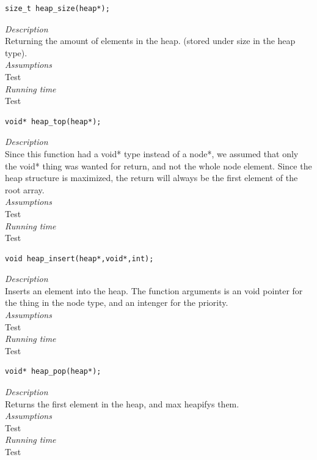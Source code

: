 \documentclass[11pt]{article}
\begin{document}
 \begin{lstlisting}[style=customc] 
size_t heap_size(heap*);\end{lstlisting} 

\textit{Description}\\
Returning the amount of elements in the heap. (stored under size in the heap type).\\
\textit{Assumptions}\\
Test\\
\textit{Running time}\\
Test





 \begin{lstlisting}[style=customc] 
void* heap_top(heap*);\end{lstlisting}

\textit{Description}\\
Since this function had a void* type instead of a node*, we assumed that only the void* thing was wanted for return, and not the whole node element. Since the heap structure is maximized, the return will always be the first element of the root array.\\
\textit{Assumptions}\\
Test\\
\textit{Running time}\\
Test

 


 \begin{lstlisting}[style=customc] 
void heap_insert(heap*,void*,int); \end{lstlisting} 

\textit{Description}\\
Inserts an element into the heap. The function arguments is an void pointer for the thing in the node type, and an intenger for the priority.\\ 
\textit{Assumptions}\\
Test\\
\textit{Running time}\\
Test


 \begin{lstlisting}[style=customc] 
void* heap_pop(heap*);\end{lstlisting}

\textit{Description}\\
Returns the first element in the heap, and max heapifys them.\\ 
\textit{Assumptions}\\
Test\\
\textit{Running time}\\
Test

  
\end{document}
